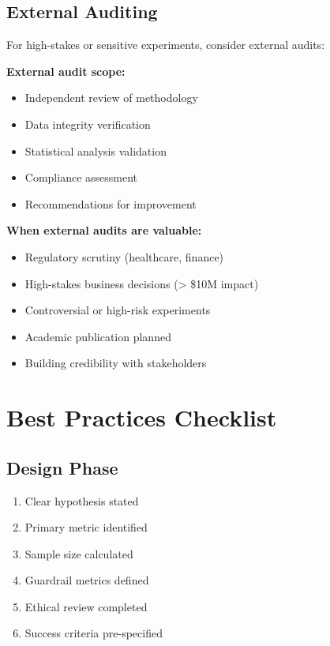 \subsection{External Auditing}

For high-stakes or sensitive experiments, consider external audits:

\textbf{External audit scope:}
\begin{itemize}
    \item Independent review of methodology
    \item Data integrity verification
    \item Statistical analysis validation
    \item Compliance assessment
    \item Recommendations for improvement
\end{itemize}

\textbf{When external audits are valuable:}
\begin{itemize}
    \item Regulatory scrutiny (healthcare, finance)
    \item High-stakes business decisions (> \$10M impact)
    \item Controversial or high-risk experiments
    \item Academic publication planned
    \item Building credibility with stakeholders
\end{itemize}

\section{Best Practices Checklist}

\subsection{Design Phase}

\begin{enumerate}
    \item[$\square$] Clear hypothesis stated
    \item[$\square$] Primary metric identified
    \item[$\square$] Sample size calculated
    \item[$\square$] Guardrail metrics defined
    \item[$\square$] Ethical review completed
    \item[$\square$] Success criteria pre-specified
\end{enumerate}

